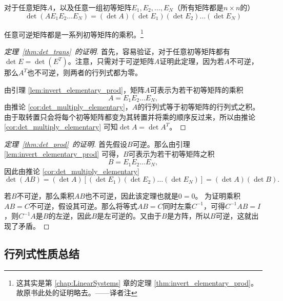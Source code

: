 \begin{corollary}\label{cor:det_multiply_elementary}
  对于任意矩阵$A$，以及任意一组初等矩阵$E_1,E_2,\ldots,E_N$（所有矩阵都是$n\times n$的）\[\det(AE_1E_2\ldots E_N)=(\det A)(\det E_1)(\det E_2)\ldots(\det E_N)\]
\end{corollary}
\begin{lemma}\label{lem:invert_elementary_prod}
  任意可逆矩阵都是一系列初等矩阵的乘积。\footnote{这其实是第 \ref{chap:LinearSystems} 章的定理 \ref{thm:invert_elementary_prod}。故原书此处的证明略去。——译者注}
\end{lemma}
\begin{proof}[定理~\ref{thm:det_trans}~的证明]
  首先，容易验证，对于任意初等矩阵都有$\det E = \det(E^T)$。注意，只需对于可逆矩阵$A$证明此定理，因为若$A$不可逆，那么$A^T$也不可逆，则两者的行列式都为零。

  由引理 \ref{lem:invert_elementary_prod}，矩阵$A$可表示为若干初等矩阵的乘积\[A=E_1E_2\ldots E_N,\]
  由推论 \ref{cor:det_multiply_elementary}，$A$的行列式等于初等矩阵的行列式之积。由于取转置只会将每个初等矩阵都变为其转置并将乘的顺序反过来，所以由推论 \ref{cor:det_multiply_elementary} 可知$\det A = \det A^T$。
\end{proof}
\begin{proof}[定理~\ref{thm:det_prod}~的证明]
  首先假设$B$可逆。那么由引理 \ref{lem:invert_elementary_prod} 可得，$B$可表示为若干初等矩阵之积
  \[B=E_1E_2\ldots E_N,\]
  因此由推论 \ref{cor:det_multiply_elementary}
  \[\det(AB)=(\det A)[(\det E_1)(\det E_2)\ldots(\det E_N)]=(\det A)(\det B).\]
  
  若$B$不可逆，那么乘积$AB$也不可逆，因此该定理也就是$0=0$。
  为证明乘积$AB=C$不可逆，假设其可逆。那么将等式$AB=C$同时左乘$C^{-1}$，可得$C^{-1}AB=I$，则$C^{-1}A$是$B$的左逆，因此$B$是左可逆的。又由于$B$是方阵，所以$B$可逆，这就出现了矛盾。
\end{proof}
\subsection{行列式性质总结}


